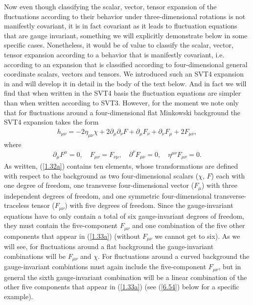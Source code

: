 \documentclass[aps,onecolumn,10pt]{revtex4}
\numberwithin{equation}{section}
\numberwithin{equation}{section}
\begin{document}
Now even though classifying the scalar, vector, tensor expansion of the fluctuations according to their behavior under three-dimensional rotations is not manifestly covariant, it is in fact covariant as it leads to fluctuation equations that are gauge invariant, something we will explicitly demonstrate below in some specific cases. Nonetheless, it would be of value to classify the scalar, vector, tensor expansion according to a behavior that is manifestly covariant, i.e. according to an expansion that is classified according to four-dimensional general coordinate scalars, vectors and tensors. We introduced such an SVT4 expansion in \cite{Amarasinghe2018} and will develop it in detail in the body of the text below. And in fact we will find that when written in the SVT4 basis the fluctuation equations are simpler than when written according to SVT3. However, for the moment we note only that for fluctuations around a four-dimensional flat Minkowski background the SVT4 expansion takes the form 
%
\begin{eqnarray}
h_{\mu\nu}=-2\eta_{\mu\nu}\chi+2\partial_{\mu}\partial_{\nu}F
+ \partial_{\mu}F_{\nu}+\partial_{\nu}F_{\mu}+2F_{\mu\nu},
\label{1.32a}
\end{eqnarray}
%
where 
%
\begin{eqnarray}
\partial_{\mu} F^{\mu}= 0, \quad F_{\mu\nu}=F_{\nu\mu},\quad \partial^{\nu}F_{\mu\nu} = 0, \quad \eta^{\mu\nu}F_{\mu\nu} = 0.
\label{1.33a}
\end{eqnarray}
%
As written, (\ref{1.32a}) contains ten elements, whose transformations are defined with respect to the background as two four-dimensional scalars ($\chi$, $F$) each with one degree of freedom, one transverse four-dimensional vector  ($F_{\mu}$) with three independent degrees of freedom, and one symmetric four-dimensional transverse-traceless tensor ($F_{\mu\nu}$) with five degrees of freedom. Since the gauge-invariant equations have to only contain a total of six gauge-invariant degrees of freedom, they must contain the five-component $F_{\mu\nu}$ and one combination of the five other components that appear in (\ref{1.33a}) (without $F_{\mu\nu}$ we cannot get to six). As we will see, for fluctuations around a flat background the gauge-invariant combinations will be $F_{\mu\nu}$ and $\chi$. For fluctuations around a curved background the gauge-invariant combintions must again include the five-component $F_{\mu\nu}$, but in general the sixth gauge-invariant combination will be a linear combination of the other five components that appear in (\ref{1.33a}) (see (\ref{6.54}) below for a specific example).
\end{document}
